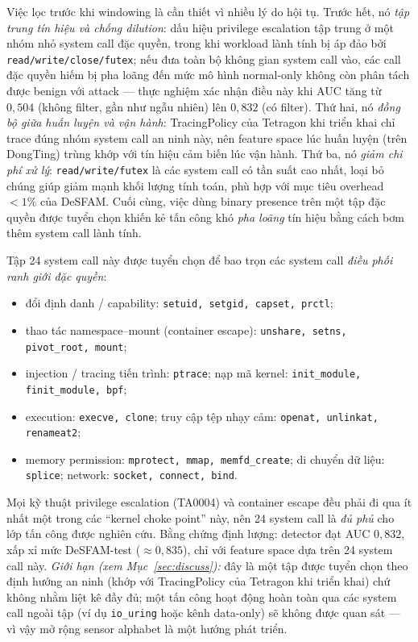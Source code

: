 Việc lọc trước khi windowing là cần thiết vì nhiều lý do hội tụ. Trước hết, nó \textit{tập trung tín hiệu và chống dilution}: dấu hiệu privilege escalation tập trung ở một nhóm nhỏ system call đặc quyền, trong khi workload lành tính bị áp đảo bởi \texttt{read/write/close/futex}; nếu đưa toàn bộ không gian system call vào, các call đặc quyền hiếm bị pha loãng đến mức mô hình normal-only không còn phân tách được benign với attack — thực nghiệm xác nhận điều này khi AUC tăng từ $0{,}504$ (không filter, gần như ngẫu nhiên) lên $0{,}832$ (có filter). Thứ hai, nó \textit{đồng bộ giữa huấn luyện và vận hành}: TracingPolicy của Tetragon khi triển khai chỉ trace đúng nhóm system call an ninh này, nên feature space lúc huấn luyện (trên DongTing) trùng khớp với tín hiệu cảm biến lúc vận hành. Thứ ba, nó \textit{giảm chi phí xử lý}: \texttt{read/write/futex} là các system call có tần suất cao nhất, loại bỏ chúng giúp giảm mạnh khối lượng tính toán, phù hợp với mục tiêu overhead $<1\%$ của DeSFAM. Cuối cùng, việc dùng binary presence trên một tập đặc quyền được tuyển chọn khiến kẻ tấn công khó \textit{pha loãng} tín hiệu bằng cách bơm thêm system call lành tính.

Tập 24 system call này được tuyển chọn để bao trọn các system call \textit{điều phối ranh giới đặc quyền}:
\begin{itemize}[leftmargin=1.2cm,itemsep=1pt]
\item đổi định danh / capability: \texttt{setuid, setgid, capset, prctl};
\item thao tác namespace--mount (container escape): \texttt{unshare, setns, pivot\_root, mount};
\item injection / tracing tiến trình: \texttt{ptrace}; nạp mã kernel: \texttt{init\_module, finit\_module, bpf};
\item execution: \texttt{execve, clone}; truy cập tệp nhạy cảm: \texttt{openat, unlinkat, renameat2};
\item memory permission: \texttt{mprotect, mmap, memfd\_create}; di chuyển dữ liệu: \texttt{splice}; network: \texttt{socket, connect, bind}.
\end{itemize}
Mọi kỹ thuật privilege escalation (TA0004) và container escape đều phải đi qua ít nhất một trong các ``kernel choke point'' này, nên 24 system call là \textit{đủ phủ} cho lớp tấn công được nghiên cứu. Bằng chứng định lượng: detector đạt AUC $0{,}832$, xấp xỉ mức DeSFAM-test ($\approx 0{,}835$), chỉ với feature space dựa trên 24 system call này. \textit{Giới hạn (xem Mục~\ref{sec:discuss}):} đây là một tập được tuyển chọn theo định hướng an ninh (khớp với TracingPolicy của Tetragon khi triển khai) chứ không nhằm liệt kê đầy đủ; một tấn công hoạt động hoàn toàn qua các system call ngoài tập (ví dụ \texttt{io\_uring} hoặc kênh data-only) sẽ không được quan sát — vì vậy mở rộng sensor alphabet là một hướng phát triển.

